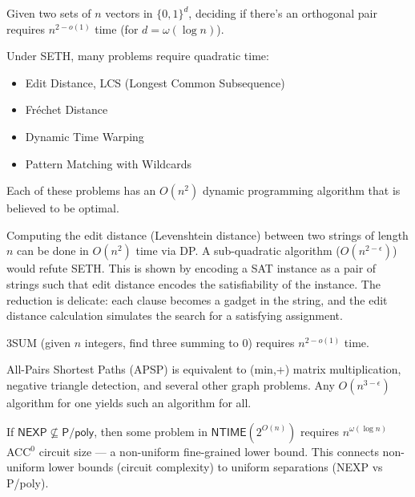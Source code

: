 \begin{definition}
Given two sets of $n$ vectors in $\{0,1\}^d$, deciding if there's an orthogonal pair requires $n^{2-o(1)}$ time (for $d = \omega(\log n)$).
\end{definition}

\begin{theorem}
Under SETH, many problems require quadratic time:
\begin{itemize}
\item Edit Distance, LCS (Longest Common Subsequence)
\item Fr\'echet Distance
\item Dynamic Time Warping
\item Pattern Matching with Wildcards
\end{itemize}
Each of these problems has an $O(n^2)$ dynamic programming algorithm that is believed to be optimal.
\end{theorem}

\begin{example}
Computing the edit distance (Levenshtein distance) between two strings of length $n$ can be done in $O(n^2)$ time via DP. A sub-quadratic algorithm ($O(n^{2-\epsilon})$) would refute SETH. This is shown by encoding a SAT instance as a pair of strings such that edit distance encodes the satisfiability of the instance. The reduction is delicate: each clause becomes a gadget in the string, and the edit distance calculation simulates the search for a satisfying assignment.
\end{example}

\begin{definition}
3SUM (given $n$ integers, find three summing to 0) requires $n^{2-o(1)}$ time.
\end{definition}

\begin{definition}
All-Pairs Shortest Paths (APSP) is equivalent to (min,+) matrix multiplication, negative triangle detection, and several other graph problems. Any $O(n^{3-\epsilon})$ algorithm for one yields such an algorithm for all.
\end{definition}

\begin{theorem}[Williams 2014]
If $\mathsf{NEXP} \not\subseteq \mathsf{P}/\mathsf{poly}$, then some problem in $\mathsf{NTIME}(2^{O(n)})$ requires $n^{\omega(\log n)}$ ACC$^0$ circuit size — a non-uniform fine-grained lower bound. This connects non-uniform lower bounds (circuit complexity) to uniform separations (NEXP vs P/poly).
\end{theorem}

